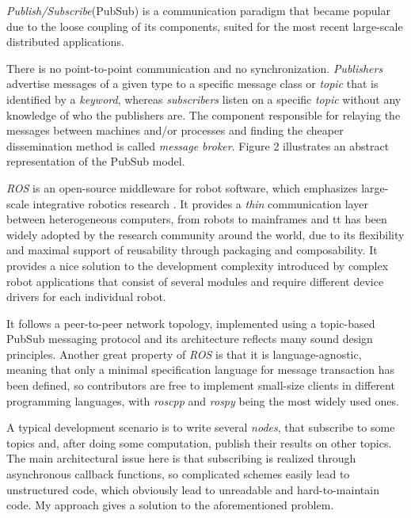 \documentclass{dithesis}
\begin{document}
\textit{Publish/Subscribe}(PubSub) is a communication paradigm that became popular due to the loose coupling of its components, suited for the most recent large-scale distributed applications.

There is no point-to-point communication and no synchronization. \textit{Publishers} advertise messages of a given type to a specific message class or \textit{topic} that is identified by a \textit{keyword}, whereas \textit{subscribers} listen on a specific \textit{topic} without any knowledge of who the publishers are. The component responsible for relaying the messages between machines and/or processes and finding the cheaper dissemination method is called \textit{message broker}. Figure 2 illustrates an abstract representation of the PubSub model.



\textit{ROS} is an open-source middleware for robot software, which emphasizes large-scale integrative robotics research \cite{ROS}. It provides a \textit{thin} communication layer between heterogeneous computers, from robots to mainframes and tt has been widely adopted by the research community around the world, due to its flexibility and maximal support of reusability through packaging and composability. It provides a nice solution to the development complexity introduced by complex robot applications that consist of several modules and require different device drivers for each individual robot. 

It follows a peer-to-peer network topology, implemented using a topic-based PubSub messaging protocol and its architecture reflects many sound design principles. Another great property of \textit{ROS} is that it is language-agnostic, meaning that only a minimal specification language for message transaction has been defined, so contributors are free to implement small-size clients in different programming languages, with \textit{roscpp} and \textit{rospy} being the most widely used ones.

A typical development scenario is to write several \textit{nodes}, that subscribe to some topics and, after doing some computation, publish their results on other topics. The main architectural issue here is that subscribing is realized through asynchronous callback functions, so complicated schemes easily lead to unstructured code, which obviously lead to unreadable and hard-to-maintain code. My approach gives a solution to the aforementioned problem.
 
\end{document}
